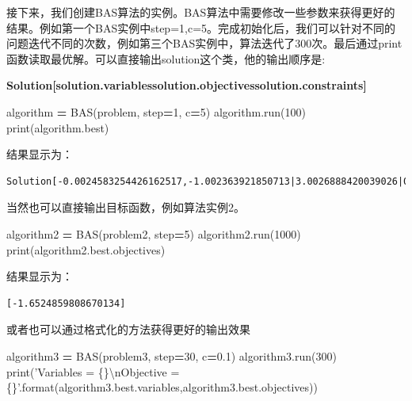 \documentclass[]{ctexbook}
\newenvironment{Shaded}{\begin{snugshade}}{\end{snugshade}}
\newcommand{\DecValTok}[1]{\textcolor[rgb]{0.00,0.00,0.81}{#1}}
\newcommand{\FloatTok}[1]{\textcolor[rgb]{0.00,0.00,0.81}{#1}}
\newcommand{\CharTok}[1]{\textcolor[rgb]{0.31,0.60,0.02}{#1}}
\newcommand{\SpecialCharTok}[1]{\textcolor[rgb]{0.00,0.00,0.00}{#1}}
\newcommand{\StringTok}[1]{\textcolor[rgb]{0.31,0.60,0.02}{#1}}
\newcommand{\OperatorTok}[1]{\textcolor[rgb]{0.81,0.36,0.00}{\textbf{#1}}}
\newcommand{\BuiltInTok}[1]{#1}
\newcommand{\NormalTok}[1]{#1}
\begin{document}
接下来，我们创建BAS算法的实例。BAS算法中需要修改一些参数来获得更好的结果。例如第一个BAS实例中step=1,c=5。完成初始化后，我们可以针对不同的问题迭代不同的次数，例如第三个BAS实例中，算法迭代了300次。最后通过print函数读取最优解。可以直接输出solution这个类，他的输出顺序是:

\textbf{Solution{[}solution.variables\textbar{}solution.objectives\textbar{}solution.constraints{]}}

\begin{Shaded}
\begin{Highlighting}[]
\NormalTok{algorithm }\OperatorTok{=}\NormalTok{ BAS(problem, step}\OperatorTok{=}\DecValTok{1}\NormalTok{, c}\OperatorTok{=}\DecValTok{5}\NormalTok{)}
\NormalTok{algorithm.run(}\DecValTok{100}\NormalTok{)}
\BuiltInTok{print}\NormalTok{(algorithm.best)}
\end{Highlighting}
\end{Shaded}

结果显示为：

\begin{verbatim}
Solution[-0.0024583254426162517,-1.002363921850713|3.0026888420039026|0]
\end{verbatim}

当然也可以直接输出目标函数，例如算法实例2。

\begin{Shaded}
\begin{Highlighting}[]
\NormalTok{algorithm2 }\OperatorTok{=}\NormalTok{ BAS(problem2, step}\OperatorTok{=}\DecValTok{5}\NormalTok{)}
\NormalTok{algorithm2.run(}\DecValTok{1000}\NormalTok{)}
\BuiltInTok{print}\NormalTok{(algorithm2.best.objectives)}
\end{Highlighting}
\end{Shaded}

结果显示为：

\begin{verbatim}
[-1.6524859808670134]
\end{verbatim}

或者也可以通过格式化的方法获得更好的输出效果

\begin{Shaded}
\begin{Highlighting}[]
\NormalTok{algorithm3 }\OperatorTok{=}\NormalTok{ BAS(problem3, step}\OperatorTok{=}\DecValTok{30}\NormalTok{, c}\OperatorTok{=}\FloatTok{0.1}\NormalTok{)}
\NormalTok{algorithm3.run(}\DecValTok{300}\NormalTok{)}
\BuiltInTok{print}\NormalTok{(}\StringTok{'Variables = }\SpecialCharTok{\{\}}\CharTok{\textbackslash{}n}\StringTok{Objective = }\SpecialCharTok{\{\}}\StringTok{'}\NormalTok{.}\BuiltInTok{format}\NormalTok{(algorithm3.best.variables,algorithm3.best.objectives))}
\end{Highlighting}
\end{Shaded}
\end{document}
